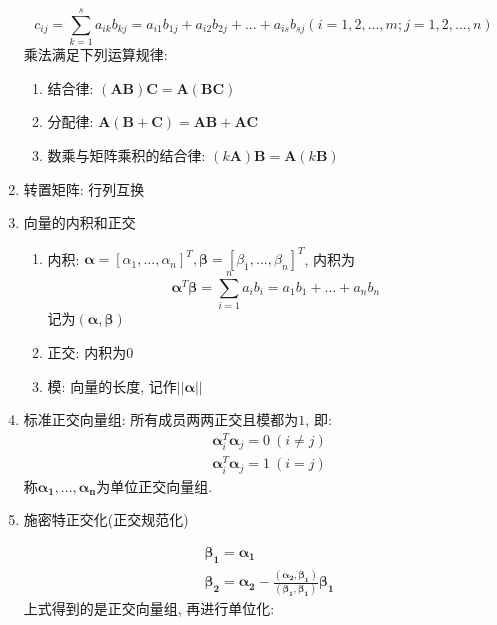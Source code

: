 \begin{enumerate}
\begin{equation*}
    	c_{ij}=\sum_{k=1}^{s}a_{ik}b_{kj}=a_{i1}b_{1j}+a_{i2}b_{2j}+...+a_{is}b_{sj}(i=1,2,...,m;j=1,2,...,n)
    \end{equation*}
    乘法满足下列运算规律:
    \begin{enumerate}
    	\item 结合律: $ (\bm{A}\bm{B})\bm{C}=\bm{A}(\bm{B}\bm{C}) $
    	\item 分配律: $ \bm{A}(\bm{B}+\bm{C})=\bm{A}\bm{B}+\bm{A}\bm{C} $
    	\item 数乘与矩阵乘积的结合律: $ (k\bm{A})\bm{B}=\bm{A}(k\bm{B}) $
    \end{enumerate}
    \item 转置矩阵: 行列互换
    \item 向量的内积和正交
    \begin{enumerate}
    	\item 内积: $ \bm{\alpha} = [\alpha_{1},...,\alpha_{n}]^{T}, \bm{\beta} = [\beta_{1},...,\beta_{n}]^{T} $, 内积为
    	\begin{equation*}
    		\bm{\alpha}^{T}\bm{\beta}=\sum_{i=1}^{n}a_{i}b_{i}=a_{1}b_{1}+...+a_{n}b_{n}
    	\end{equation*}
        记为$ (\bm{\alpha},\bm{\beta}) $
    	\item 正交: 内积为$ 0 $
    	\item 模: 向量的长度, 记作$ ||\bm{\alpha}|| $
    \end{enumerate}
    \item 标准正交向量组: 所有成员两两正交且模都为$ 1 $, 即:
    \begin{equation*}
    	\begin{aligned}
    		 &\bm{\alpha}_{i}^{T}\bm{\alpha}_{j}=0\ (i\neq j)\\&\bm{\alpha}_{i}^{T}\bm{\alpha}_{j}=1\ (i=j)
    	\end{aligned}
    \end{equation*}
    称$ \bm{\alpha_{1}},...,\bm{\alpha_{n}} $为单位正交向量组.
    \item 施密特正交化(正交规范化)\par
    \begin{equation*}
    	\begin{aligned}
    		&\bm{\beta_{1}}=\bm{\alpha_{1}}\\&\bm{\beta_{2}}=\bm{\alpha_{2}}-\frac{(\bm{\alpha_{2}},\bm{\beta_{1}})}{(\bm{\beta_{1}},\bm{\beta_{1}})}\bm{\beta_{1}}
    	\end{aligned}
    \end{equation*}
    上式得到的是正交向量组, 再进行单位化:\par

\end{enumerate}
